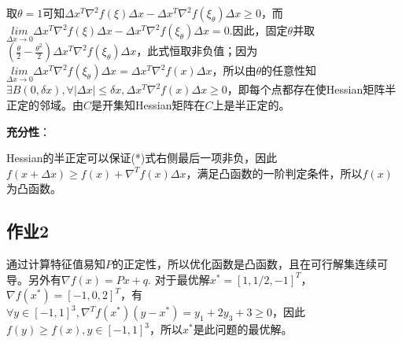 \documentclass[11pt]{ctexart}
\begin{document}
取$\theta=1$可知$\Delta x^T\nabla^2f(\xi)\Delta x-\Delta x^T\nabla^2f(\xi_{\theta})\Delta x\geq0$，而$\underset{\Delta x\to0}{lim}\Delta x^T\nabla^2f(\xi)\Delta x-\Delta x^T\nabla^2f(\xi_{\theta})\Delta x=0$.因此，固定$\theta$并取$(\frac{\theta}{2}-\frac{\theta^2}{2})\Delta x^T\nabla^2f(\xi_{\theta})\Delta x$，此式恒取非负值；因为$\underset{\Delta x\to0}{lim}\Delta x^T\nabla^2f(\xi_{\theta})\Delta x=\Delta x^T\nabla^2f(x)\Delta x$，所以由$\theta$的任意性知$\exists B(0,\delta x),\forall|\Delta x|\leq\delta x,\Delta x^T\nabla^2f(x)\Delta x\geq0$，即每个点都存在使Hessian矩阵半正定的邻域。由$C$是开集知Hessian矩阵在$C$上是半正定的。


\textbf{充分性}：

Hessian的半正定可以保证(*)式右侧最后一项非负，因此$f(x+\Delta x)\geq f(x)+\nabla^Tf(x)\Delta x$，满足凸函数的一阶判定条件，所以$f(x)$为凸函数。

\subsection*{作业2}

通过计算特征值易知$P$的正定性，所以优化函数是凸函数，且在可行解集连续可导。另外有$\nabla f(x)=Px+q$.
对于最优解$x^*=[1, 1/2, -1]^T$，$\nabla f(x^*)=[-1, 0, 2]^T$，有$\forall y\in [-1,1]^3,\nabla^Tf(x^*)(y-x^*)=y_1+2y_3+3\geq0$，因此$f(y)\geq f(x),y\in [-1,1]^3$，所以$x^*$是此问题的最优解。
\end{document}
